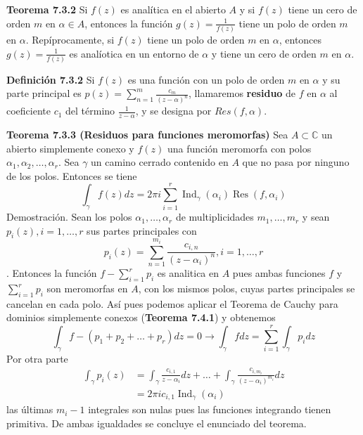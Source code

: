 \documentclass[a4paper, 11pt]{extarticle}
\newcommand{\tma}[1]{\textcolor{rojo}{\textbf{Teorema #1}}}
\newcommand{\defi}[1]{\textcolor{azul}{\textbf{Definición #1}}}
\newcommand{\dem}[1]{\textcolor{gris}{\small{Demostración. #1}}}
\begin{document}
\begin{multicols*}{2}
\tma{7.3.2} Si \(f(z)\) es analítica en el abierto \(A\) y si \(f(z)\)
tiene un cero de orden \(m\) en \(\alpha \in A\), entonces la función \(g(z) = \frac{1}{f(z)}\) tiene un polo de orden \(m\) en \(\alpha\).
Repíprocamente, si \(f(z)\) tiene un polo de orden \(m\) en \(\alpha\),
entonces \(g(z) = \frac{1}{f(z)}\) es analíotica en un entorno de \(\alpha\)
y tiene un cero de orden \(m\) en \(\alpha\).

\defi{7.3.2} Si \(f(z)\) es una función con un polo de orden \(m\) en \(\alpha\) y su parte principal es \(p(z) = \sum _{n=1}^{m}
\frac{c_m}{(z-\alpha)^n}\), llamaremos \textbf{residuo} de \(f\) en \(\alpha\) al
coeficiente \(c_1\) del término \(\frac{1}{z - \alpha}\), y se designa por \(Res(f, \alpha)\).

\tma{7.3.3 (Residuos para funciones meromorfas)}
 Sea \(A \subset \mathbb{C}\) un abierto simplemente conexo y \(f(z)\) una función
 meromorfa con polos \(\alpha_{1}, \alpha_{2}, \ldots, \alpha_{r}\). 
Sea \(\gamma\) un camino cerrado contenido en \(A\) que no pasa por ninguno de 
los polos. Entonces se tiene
$$
\int_{\gamma} f(z) d z=2 \pi i \sum_{i=1}^{r} \operatorname{Ind}_{\gamma}\left(\alpha_{i}\right) \operatorname{Res}\left(f, \alpha_{i}\right)
$$
\dem{Sean los polos $\alpha_{1}, \ldots, \alpha_{r}$ de multiplicidades
 $m_{1}, \ldots, m_{r}$ y sean
$p_{i}(z), i=1, \ldots, r$ sus partes principales con
$$
p_{i}(z)=\sum_{n=1}^{m_{i}} \frac{c_{i, n}}{\left(z-\alpha_{i}\right)^{n}}, i=1, \ldots, r
$$.
Entonces la función $f-\sum_{i=1}^{r} p_{i}$ es analitica en $A$ pues ambas
 funciones $f$ y $\sum_{i=1}^{r} p_{i}$ son meromorfas en $A$, con los mismos polos, 
cuyas partes principales se cancelan en cada polo.
Así pues podemos aplicar el Teorema de Cauchy para
dominios simplemente conexos (\tma{7.4.1}) y obtenemos 
$$
\int_{\gamma} f-\left(p_{1}+p_{2}+\ldots+p_{r}\right) d z=0 \rightarrow 
\int_{\gamma} f d z=\sum_{i=1}^{r} \int_{\gamma} p_{i} d z
$$
Por otra parte
$$
\begin{aligned}
\int_{\gamma} p_{i}(z) &=\int_{\gamma} \frac{c_{i, 1}}{z-\alpha_{i}} d z+\ldots+\int_{\gamma} \frac{c_{i, m_{i}}}{\left(z-\alpha_{i}\right)^{m_{i}}} d z \\
&=2 \pi i c_{i, 1} \operatorname{Ind}_{\gamma}\left(\alpha_{i}\right)
\end{aligned}
$$
las últimas $m_{i}-1$ integrales son nulas pues las funciones integrando tienen
 primitiva. De ambas igualdades se concluye el enunciado del teorema.}



\end{multicols*}
\end{document}
